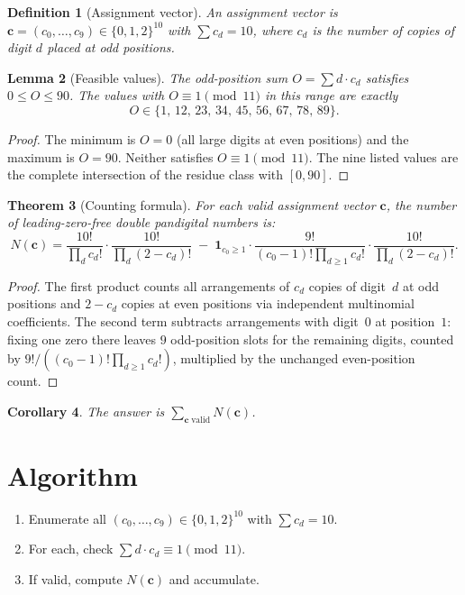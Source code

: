 \documentclass[12pt]{article}
\newtheorem{theorem}{Theorem}
\newtheorem{lemma}[theorem]{Lemma}
\newtheorem{corollary}[theorem]{Corollary}
\newtheorem{definition}[theorem]{Definition}
\begin{document}
\begin{definition}[Assignment vector]
An \emph{assignment vector} is $\mathbf{c} = (c_0,\ldots,c_9) \in \{0,1,2\}^{10}$ with $\sum c_d = 10$, where $c_d$ is the number of copies of digit $d$ placed at odd positions.
\end{definition}

\begin{lemma}[Feasible values]
The odd-position sum $O = \sum d\cdot c_d$ satisfies $0 \le O \le 90$. The values with $O\equiv 1\pmod{11}$ in this range are exactly
\[
O \in \{1,\,12,\,23,\,34,\,45,\,56,\,67,\,78,\,89\}.
\]
\end{lemma}

\begin{proof}
The minimum is $O=0$ (all large digits at even positions) and the maximum is $O=90$. Neither satisfies $O\equiv 1\pmod{11}$. The nine listed values are the complete intersection of the residue class with $[0,90]$.
\end{proof}

\begin{theorem}[Counting formula]
For each valid assignment vector $\mathbf{c}$, the number of leading-zero-free double pandigital numbers is:
\[
N(\mathbf{c}) = \frac{10!}{\prod_d c_d!}\cdot\frac{10!}{\prod_d(2-c_d)!} \;-\; \mathbf{1}_{c_0\ge 1}\cdot\frac{9!}{(c_0-1)!\prod_{d\ge 1}c_d!}\cdot\frac{10!}{\prod_d(2-c_d)!}.
\]
\end{theorem}

\begin{proof}
The first product counts all arrangements of $c_d$ copies of digit~$d$ at odd positions and $2-c_d$ copies at even positions via independent multinomial coefficients. The second term subtracts arrangements with digit~$0$ at position~$1$: fixing one zero there leaves $9$ odd-position slots for the remaining digits, counted by $9!/((c_0-1)!\prod_{d\ge 1}c_d!)$, multiplied by the unchanged even-position count.
\end{proof}

\begin{corollary}
The answer is $\sum_{\mathbf{c}\;\text{valid}} N(\mathbf{c})$.
\end{corollary}

\section{Algorithm}
\begin{enumerate}
\item Enumerate all $(c_0,\ldots,c_9) \in \{0,1,2\}^{10}$ with $\sum c_d = 10$.
\item For each, check $\sum d\cdot c_d \equiv 1 \pmod{11}$.
\item If valid, compute $N(\mathbf{c})$ and accumulate.
\end{enumerate}
\end{document}
